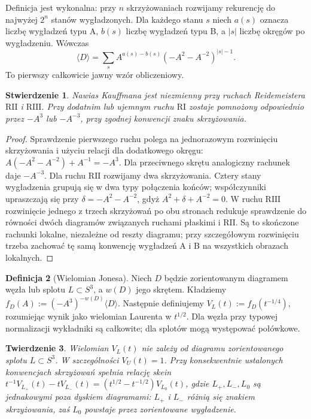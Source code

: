 \documentclass[11pt,a4paper]{report}
\numberwithin{equation}{section}
\theoremstyle{plain}
\newtheorem{twierdzenie}{Twierdzenie}[section]
\newtheorem{stwierdzenie}[twierdzenie]{Stwierdzenie}
\theoremstyle{definition}
\newtheorem{definicja}[twierdzenie]{Definicja}
\theoremstyle{remark}
\begin{document}
Definicja jest wykonalna: przy $n$ skrzyżowaniach rozwijamy
rekurencję do najwyżej $2^n$ stanów wygładzonych. Dla każdego
stanu $s$ niech $a(s)$ oznacza liczbę wygładzeń typu A,
$b(s)$ liczbę wygładzeń typu B, a $|s|$ liczbę okręgów po
wygładzeniu. Wówczas
\[
\langle D\rangle=\sum_s A^{a(s)-b(s)}
(-A^2-A^{-2})^{|s|-1}.
\]
To pierwszy całkowicie jawny wzór obliczeniowy.

\begin{stwierdzenie}
Nawias Kauffmana jest niezmienny przy ruchach Reidemeistera
$\mathrm{R II}$ i $\mathrm{R III}$. Przy dodatnim lub ujemnym
ruchu $\mathrm{R I}$ zostaje pomnożony odpowiednio przez
$-A^3$ lub $-A^{-3}$, przy zgodnej konwencji znaku skrzyżowania.
\end{stwierdzenie}

\begin{proof}
Sprawdzenie pierwszego ruchu polega na jednorazowym rozwinięciu
skrzyżowania i użyciu relacji dla dodatkowego okręgu:
$A(-A^2-A^{-2})+A^{-1}=-A^3$.
Dla przeciwnego skrętu analogiczny rachunek daje $-A^{-3}$.
Dla ruchu $\mathrm{R II}$ rozwijamy dwa skrzyżowania. Cztery
stany wygładzenia grupują się w dwa typy połączenia końców;
współczynniki upraszczają się przy
$\delta=-A^2-A^{-2}$, gdyż $A^2+\delta+A^{-2}=0$.
W ruchu $\mathrm{R III}$ rozwinięcie jednego z trzech
skrzyżowań po obu stronach redukuje sprawdzenie do równości
dwóch diagramów związanych ruchami płaskimi i $\mathrm{R II}$.
Są to skończone rachunki lokalne, niezależne od reszty diagramu;
przy szczegółowym rozwinięciu trzeba zachować tę samą konwencję
wygładzeń A i B na wszystkich obrazach lokalnych.
\end{proof}

\begin{definicja}[Wielomian Jonesa]
Niech $D$ będzie zorientowanym diagramem węzła lub splotu
$L\subset S^3$, a $w(D)$ jego skrętem. Kładziemy
$f_D(A):=(-A^3)^{-w(D)}\langle D\rangle$.
Następnie definiujemy $V_L(t):=f_D(t^{-1/4})$,
rozumiejąc wynik jako wielomian Laurenta w $t^{1/2}$.
Dla węzła przy typowej normalizacji wykładniki są całkowite;
dla splotów mogą występować połówkowe.
\end{definicja}

\begin{twierdzenie}
Wielomian $V_L(t)$ nie zależy od diagramu zorientowanego
splotu $L\subset S^3$. W szczególności $V_U(t)=1$.
Przy konsekwentnie ustalonych konwencjach skrzyżowań spełnia
relację skein
$t^{-1}V_{L_+}(t)-tV_{L_-}(t)=
(t^{1/2}-t^{-1/2})V_{L_0}(t)$,
gdzie $L_+,L_-,L_0$ są jednakowymi poza dyskiem diagramami:
$L_+$ i $L_-$ różnią się znakiem skrzyżowania, zaś $L_0$
powstaje przez zorientowane wygładzenie.
\end{twierdzenie}
\end{document}
